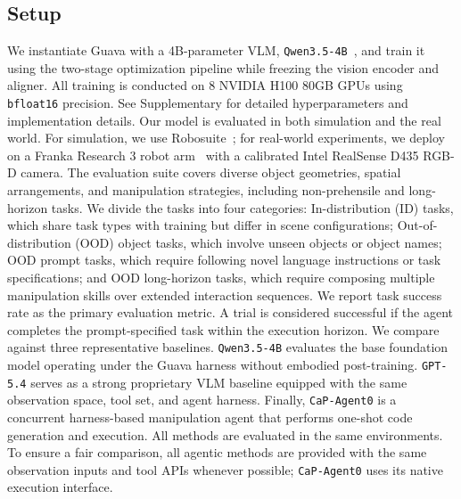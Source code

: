 \documentclass{llmxive}
\begin{document}
\subsection{Setup}
We instantiate Guava with a 4B-parameter VLM, \texttt{Qwen3.5-4B}~\citep{qwen2026qwen35}, and train it using the two-stage optimization pipeline while freezing the vision encoder and aligner. All training is conducted on 8 NVIDIA H100 80GB GPUs using \texttt{bfloat16} precision. See Supplementary for detailed hyperparameters and implementation details.
Our model is evaluated in both simulation and the real world. For simulation, we use Robosuite~\citep{robosuite2020}; for real-world experiments, we deploy on a Franka Research 3 robot arm~\citep{franka_research_3} with a calibrated Intel RealSense D435 RGB-D camera.
The evaluation suite covers diverse object geometries, spatial arrangements, and manipulation strategies, including non-prehensile and long-horizon tasks.
We divide the tasks into four categories: In-distribution (ID) tasks, which share task types with training but differ in scene configurations; Out-of-distribution (OOD) object tasks, which involve unseen objects or object names; OOD prompt tasks, which require following novel language instructions or task specifications; and OOD long-horizon tasks, which require composing multiple manipulation skills over extended interaction sequences.
We report task success rate as the primary evaluation metric. A trial is considered successful if the agent completes the prompt-specified task within the execution horizon. 
We compare against three representative baselines. \texttt{Qwen3.5-4B} evaluates the base foundation model operating under the Guava harness without embodied post-training. \texttt{GPT-5.4} serves as a strong proprietary VLM baseline equipped with the same observation space, tool set, and agent harness. Finally, \texttt{CaP-Agent0} is a concurrent harness-based manipulation agent that performs one-shot code generation and execution. All methods are evaluated in the same environments. To ensure a fair comparison, all agentic methods are provided with the same observation inputs and tool APIs whenever possible; \texttt{CaP-Agent0} uses its native execution interface.
\end{document}
